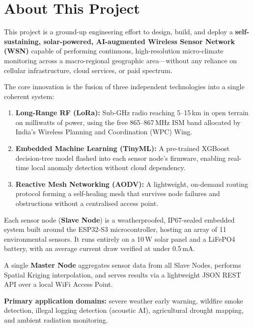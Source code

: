 \documentclass[12pt,a4paper]{article}
\begin{document}
\tableofcontents
\newpage

\section*{About This Project}

This project is a ground-up engineering effort to design, build, and deploy a \textbf{self-sustaining, solar-powered, AI-augmented Wireless Sensor Network (WSN)} capable of performing continuous, high-resolution micro-climate monitoring across a macro-regional geographic area---without any reliance on cellular infrastructure, cloud services, or paid spectrum.

The core innovation is the fusion of three independent technologies into a single coherent system:

\begin{enumerate}[leftmargin=*, label=\textbf{\arabic*.}]
    \item \textbf{Long-Range RF (LoRa):} Sub-GHz radio reaching 5--15\,km in open terrain on milliwatts of power, using the free 865--867\,MHz ISM band allocated by India's Wireless Planning and Coordination (WPC) Wing.
    \item \textbf{Embedded Machine Learning (TinyML):} A pre-trained XGBoost decision-tree model flashed into each sensor node's firmware, enabling real-time local anomaly detection without cloud dependency.
    \item \textbf{Reactive Mesh Networking (AODV):} A lightweight, on-demand routing protocol forming a self-healing mesh that survives node failures and obstructions without a centralised access point.
\end{enumerate}

Each sensor node (\textbf{Slave Node}) is a weatherproofed, IP67-sealed embedded system built around the ESP32-S3 microcontroller, hosting an array of 11 environmental sensors. It runs entirely on a 10\,W solar panel and a LiFePO4 battery, with an average current draw verified at under 0.5\,mA.

A single \textbf{Master Node} aggregates sensor data from all Slave Nodes, performs Spatial Kriging interpolation, and serves results via a lightweight JSON REST API over a local WiFi Access Point.

\textbf{Primary application domains:} severe weather early warning, wildfire smoke detection, illegal logging detection (acoustic AI), agricultural drought mapping, and ambient radiation monitoring.
\end{document}
